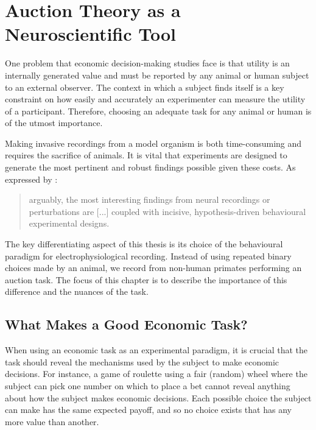 
\chapter{Auction Theory as a Neuroscientific Tool}

\ifpdf
    \graphicspath{{Chapter2/Figs/Raster/}{Chapter2/Figs/PDF/}{Chapter2/Figs/}}
\else
    \graphicspath{{Chapter2/Figs/Vector/}{Chapter2/Figs/}}
\fi

One problem that economic decision-making studies face is that utility is an internally generated value and must be reported by any animal or human subject to an external observer. The context in which a subject finds itself is a key constraint on how easily and accurately an experimenter can measure the utility of a participant. Therefore, choosing an adequate task for any animal or human is of the utmost importance.

Making invasive recordings from a model organism is both time-consuming and requires the sacrifice of animals. It is vital that experiments are designed to generate the most pertinent and robust findings possible given these costs. As expressed by \cite{nivPrimacyBehavioralResearch2021}: 

\begin{quote}
    arguably, the most interesting findings from neural recordings or perturbations are [...] coupled with incisive, hypothesis-driven behavioural experimental designs.
\end{quote}

The key differentiating aspect of this thesis is its choice of the behavioural paradigm for electrophysiological recording. Instead of using repeated binary choices made by an animal, we record from non-human primates performing an auction task. The focus of this chapter is to describe the importance of this difference and the nuances of the task.

\clearpage
\section{What Makes a Good Economic Task?}

When using an economic task as an experimental paradigm, it is crucial that the task should reveal the mechanisms used by the subject to make economic decisions.  For instance, a game of roulette using a fair (random) wheel where the subject can pick one number on which to place a bet cannot reveal anything about how the subject makes economic decisions. Each possible choice the subject can make has the same expected payoff, and so no choice exists that has any more value than another.

